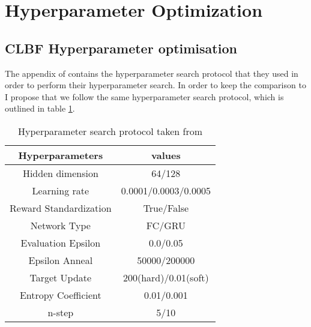 \documentclass[systems,article,submit,pdftex,moreauthors]{Definitions/mdpi}
\begin{document}


 \setcounter{section}{0}
\appendix
\section{Hyperparameter Optimization}
\label{sec:Appendix}
\subsection*{CLBF Hyperparameter optimisation}
The appendix of \cite{DBLP:Benchmarking} contains the hyperparameter search protocol that they used in order to perform their hyperparameter search. In order to keep the comparison to \cite{DBLP:Benchmarking} I propose that we follow the same hyperparameter search protocol, which is outlined in table \ref{tab:hyperparameters}.

\begin{table}[!h]
\centering
\begin{tabular}{c c}
\toprule
Hyperparameters        &values                \\ \midrule
Hidden dimension       & 64/128               \\ 
Learning rate          & 0.0001/0.0003/0.0005 \\ 
Reward Standardization & True/False           \\ 
Network Type           & FC/GRU               \\ 
Evaluation Epsilon     & 0.0/0.05             \\ 
Epsilon Anneal         & 50000/200000         \\ 
Target Update          & 200(hard)/0.01(soft) \\ 
Entropy Coefficient    & 0.01/0.001           \\ 
n-step                 & 5/10                 \\ \bottomrule
\end{tabular}
\caption{Hyperparameter search protocol taken from \cite{DBLP:Benchmarking}}
\label{tab:hyperparameters}
\end{table}
\end{document}
